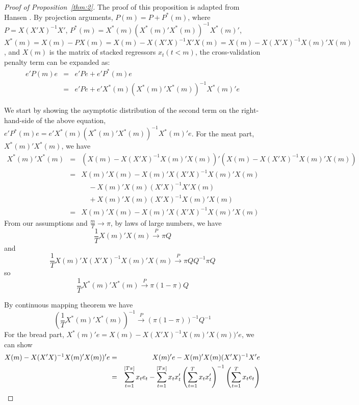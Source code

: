 \begin{proof}[Proof of Proposition~\ref{thm:2}]
The proof of this proposition is adapted from Hansen \cite{hansen2009averaging}. By projection arguments, $P(m) = P + P^{*}(m)$, where $P = X(X'X)^{-1}X'$, $P^{*}(m) = X^{*}(m)(X^{*}(m)'X^{*}(m))^{-1}X^{*}(m)'$, $X^{*}(m) = X(m) - PX(m) = X(m) - X(X'X)^{-1}X'X(m) = X(m) - X(X'X)^{-1}X(m)'X(m)$, and $X(m)$ is the matrix of stacked regressors $x_{t}(t < m)$, the cross-validation penalty term can be expanded as:
    \begin{eqnarray*}
    e'P(m)e & = & e'Pe + e'P^{*}(m)e \\
            & = & e'Pe + e'X^{*}(m)(X^{*}(m)'X^{*}(m))^{-1}X^{*}(m)'e
    \end{eqnarray*}

\noindent We start by showing the asymptotic distribution of the second term on the right-hand-side of the above equation, $e'P^{*}(m)e = e'X^{*}(m)(X^{*}(m)'X^{*}(m))^{-1}X^{*}(m)'e$. For the meat part, $X^{*}(m)'X^{*}(m)$, we have
    \begin{eqnarray*}
    X^{*}(m)'X^{*}(m) & = & (X(m)-X(X'X)^{-1}X(m)'X(m))'(X(m)-X(X'X)^{-1}X(m)'X(m)) \\
                      & = & X(m)'X(m) - X(m)'X(X'X)^{-1}X(m)'X(m) \\
    				  &   & \quad - X(m)'X(m)(X'X)^{-1}X'X(m) \\
                      &   & \quad + X(m)'X(m)(X'X)^{-1}X(m)'X(m) \\
    				  & = & X(m)'X(m) - X(m)'X(X'X)^{-1}X(m)'X(m)
    \end{eqnarray*}
\noindent From our assumptions and $\frac{m}{T} \rightarrow \pi$, by laws of large numbers, we have
    \begin{equation*}
        \frac{1}{T} X(m)'X(m) \stackrel{P}{\rightarrow} \pi Q
    \end{equation*}
and
    \begin{equation*}
        \frac{1}{T} X(m)'X(X'X)^{-1}X(m)'X(m) \stackrel{P}{\rightarrow} \pi QQ^{-1} \pi Q
    \end{equation*}
so 
    \begin{equation*}
        \frac{1}{T} X^{*}(m)'X^{*}(m) \stackrel{P}{\rightarrow} \pi (1-\pi)Q
    \end{equation*}

\noindent By continuous mapping theorem we have 
    \begin{equation*}
        (\frac{1}{T} X^{*}(m)'X^{*}(m))^{-1}\stackrel{P}{\rightarrow}(\pi (1-\pi))^{-1}Q^{-1}
    \end{equation*}
\noindent For the bread part, $X^{*}(m)'e = X(m) - X(X'X)^{-1}X(m)'X(m))'e$, we can show 
    \begin{eqnarray*}
         X(m) - X(X'X)^{-1}X(m)'X(m))'e & = & X(m)'e - X(m)'X(m)(X'X)^{-1}X'e \\
                                        & = & \sum_{t=1}^{[T \pi]} x_t e_t - \sum_{t=1}^{[T \pi]} x_t x_t' \left( \sum_{t=1}^{T} x_t x_t' \right) ^{-1} \left( \sum_{t=1}^{T} x_t e_t \right)
    \end{eqnarray*}


\end{proof}
